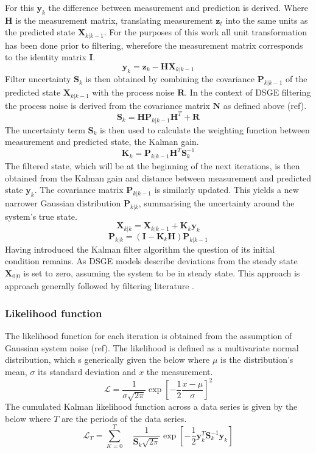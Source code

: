 \documentclass[12pt,a4paper,english]{article} %
\newcommand{\matr}[1]{\mathbf{#1}} %
\newcommand{\Lagr}{\mathcal{L}} %
\begin{document}
	For this $\matr{y}_k$ the difference between measurement and prediction is derived. Where $\matr H$ is the measurement matrix, translating measurement $\matr{z}_t$ into the same units as the predicted state $\matr{X}_{k| k-1}$. For the purposes of this work all unit transformation has been done prior to filtering, wherefore the measurement matrix corresponds to the identity matrix $\matr{I}$.
	\[
		\matr{y}_{k} = \matr{z}_k - \matr H \matr{X}_{k| k-1}
	\]
	Filter uncertainty $\matr{S}_k$ is then obtained by combining the covariance $\matr{P}_{k| k-1}$ of the predicted state $\matr{X}_{k| k-1}$ with the process noise $\matr{R}$. In the context of DSGE filtering the process noise is derived from the covariance matrix $\matr{N}$ as defined above (ref).
	\[
		\matr{S}_k = \matr H \matr{P}_{k| k-1} \matr{H}^T + \matr{R}
	\]
	The uncertainty term $\matr{S}_{k}$ is then used to calculate the weighting function between measurement and predicted state, the Kalman gain. 
	\[
		\matr{K}_k = \matr{P}_{k| k-1} \matr{H}^T \matr{S}_{k}^{-1}
	\]
	The filtered state, which will be at the beginning of the next iterations, is then obtained from the Kalman gain and distance between measurement and predicted state $\matr{y}_k$. The covariance matrix $\matr{P}_{k|k-1}$ is similarly updated. This yields a new narrower Gaussian distribution $\matr{P}_{k|k}$, summarising the uncertainty around the system's true state.
	\[
		\matr{X}_{k|k} = \matr{X}_{k| k-1} + \matr{K}_k \matr{y}_k
	\]
	\[
		\matr{P}_{k|k} = (\matr I - \matr{K}_k \matr{H}) \matr{P}_{k|k-1}
	\]
	Having introduced the Kalman filter algorithm the question of its initial condition remains. As DSGE models describe deviations from the steady state $\matr{X}_{0|0}$ is set to zero, assuming the system to be in steady state. This approach is approach generally followed by filtering literature \cite{schorfheide_loss_2000}. 
	
	\subsubsection{Likelihood function} \label{kalman_ll}
	The likelihood function for each iteration is obtained from the assumption of Gaussian system noise (ref). The likelihood is defined as a multivariate normal distribution, which s generically given the below where $\mu$ is the distribution's mean, $\sigma$ its standard deviation and $x$ the measurement.
	\begin{equation}
		\Lagr = \frac{1}{\sigma \sqrt{2 \pi}} \exp [- \frac{1}{2} \frac{x - \mu}{\sigma}]^2
	\end{equation}
	The cumulated Kalman likelihood function across a data series is given by the below where $T$ are the periods of the data series.
	\begin{equation}
		\Lagr_T = \sum_{K=0}^{T} \quad \frac{1}{\matr{S}_k \sqrt{2 \pi}} \exp [- \frac{1}{2} \matr{y}_k^{T} \matr{S}_{k}^{-1} \matr{y}_k]
	\end{equation}
		
\end{document}
